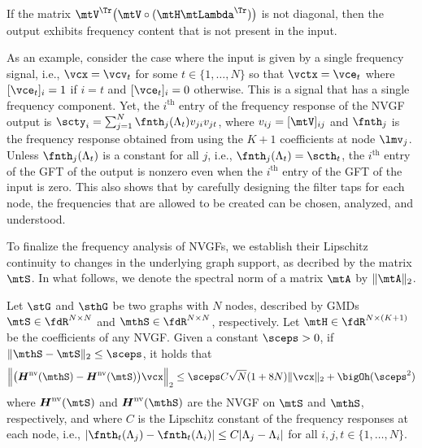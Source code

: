 \begin{corollary} \label{cor:NVGFnewFreq}
If the matrix $\mtV^{\Tr} \big( \mtV \circ (\mtH \mtLambda^{\Tr}) \big)$ is not diagonal, then the output exhibits frequency content that is not present in the input.
\end{corollary}

\else
As an example, consider the case where the input is given by a single frequency signal, i.e., $\vcx = \vcv_{t}$ for some $t\in\{1,\ldots,N\}$ so that $\vctx = \vce_{t}$ where $[\vce_{t}]_{i} = 1$ if $i=t$ and $[\vce_{t}]_{i} = 0$ otherwise. This is a signal that has a single frequency component. Yet, the $i^{\text{th}}$ entry of the frequency response of the NVGF output is $\scty_{i} = \sum_{j=1}^{N} \fnth_{j}(\lambda_{t}) v_{ji}v_{jt}$, where $v_{ij} = [\mtV]_{ij}$ and $\fnth_{j}$ is the frequency response obtained from using the $K+1$ coefficients at node $\lmv_{j}$. Unless $\fnth_{j}(\lambda_{t})$ is a constant for all $j$, i.e., $\fnth_{j}(\lambda_{t}) = \scth_{t}$, the $i^{\text{th}}$ entry of the GFT of the output is nonzero even when the $i^{\text{th}}$ entry of the GFT of the input is zero. This also shows that by carefully designing the filter taps for each node, the frequencies that are allowed to be created can be chosen, analyzed, and understood.
\fi

To finalize the frequency analysis of NVGFs, we establish their Lipschitz continuity to changes in the underlying graph support, as decribed by the matrix $\mtS$. In what follows, we denote the spectral norm of a matrix $\mtA$ by $\|\mtA\|_2$.

\begin{theorem} \label{thm:stability}
Let $\stG$ and $\sthG$ be two graphs with $N$ nodes, described by GMDs $\mtS \in \fdR^{N \times N}$ and $\mthS \in \fdR^{N \times N}$, respectively. Let $\mtH \in \fdR^{N \times(K+1)}$ be the coefficients of any NVGF. Given a constant $\sceps > 0$, if $\|\mthS - \mtS\|_{2} \leq \sceps$, it holds that
\begin{equation} \label{eq:stability}
    \Big\| \big( \mtfnH^{\text{nv}}(\mthS) - \mtfnH^{\text{nv}}(\mtS) \big) \vcx \Big\|_{2} \leq \sceps C \sqrt{N} ( 1 + 8N) \| \vcx \|_{2} + \bigOh(\sceps^{2})
\end{equation}
%
where $\mtfnH^{\text{nv}}(\mtS)$ and $\mtfnH^{\text{nv}}(\mthS)$ are the NVGF on $\mtS$ and $\mthS$, respectively, and where $C$ is the Lipschitz constant of the frequency responses at each node, i.e., $|\fnth_{t}(\lambda_{j})-\fnth_{t}(\lambda_{i})| \leq C |\lambda_{j} - \lambda_{i}|$ for all $i,j,t \in \{1,\ldots,N\}$.
\end{theorem}

